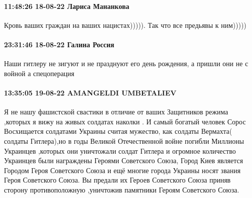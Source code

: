 \paragraph{11:48:26 18-08-22 Лариса Мананкова}

Кровь ваших граждан на ваших нацистах))))). Так что все предьявы к ним)))))

\paragraph{23:31:46 18-08-22 Галина Россия}

Наши гитлеру не зигуют и не празднуют его день рождения, а пришли они не с
войной а спецоперация

\paragraph{13:35:05 19-08-22 AMANGELDI UMBETALIEV}

Я не нашу фашистской свастики в отличие от ваших Защитников режима ,которых я вижу на живых солдатах наколки .
И самый богатый человек Сорос Восхищается солдатами Украины считая мужество, как солдаты Вермахта( солдаты Гитлера),но в годы Великой Отечественной войне погибли Миллионы Украинцев ,которых они уничтожали солдат Гитлера  и огромное количество Украинцев были награждены Героями Советского Союза, Город Киев является Городом Героя Советского Союза и ещё многие города Украины носят звания Героя Советского Союза.
Вы предали их Героев Советского Союза приняв сторону противоположную ,уничтожив памятники Героям Советского Союза.

